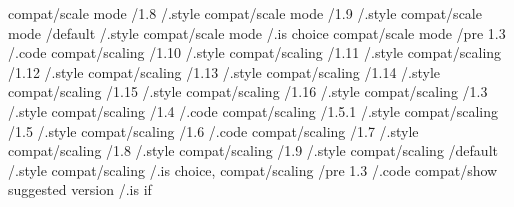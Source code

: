 compat/scale mode              /1.8         /.style
compat/scale mode              /1.9         /.style
compat/scale mode              /default     /.style
compat/scale mode                           /.is choice
compat/scale mode              /pre 1.3     /.code
compat/scaling                 /1.10        /.style
compat/scaling                 /1.11        /.style
compat/scaling                 /1.12        /.style
compat/scaling                 /1.13        /.style
compat/scaling                 /1.14        /.style
compat/scaling                 /1.15        /.style
compat/scaling                 /1.16        /.style
compat/scaling                 /1.3         /.style
compat/scaling                 /1.4         /.code
compat/scaling                 /1.5.1       /.style
compat/scaling                 /1.5         /.style
compat/scaling                 /1.6         /.code
compat/scaling                 /1.7         /.style
compat/scaling                 /1.8         /.style
compat/scaling                 /1.9         /.style
compat/scaling                 /default     /.style
compat/scaling                              /.is choice, 
compat/scaling                 /pre 1.3     /.code
compat/show suggested version               /.is if      

